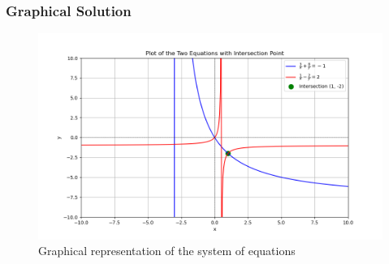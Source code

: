 \documentclass{beamer}
\begin{document}
\begin{frame}
    \frametitle{Graphical Solution}
    \begin{figure}
        \centering
        \includegraphics[width=0.7\linewidth]{figs/Q3.png}
        \caption{Graphical representation of the system of equations}
    \end{figure}
\end{frame}
\end{document}
